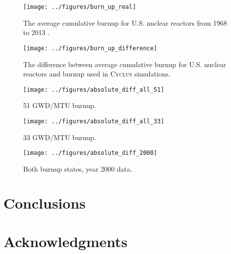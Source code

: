 \documentclass{anstrans}
\newcommand{\Cyclus}{\textsc{Cyclus}\xspace}%
\begin{document}
\begin{figure}[t] %
	\centering
	\texttt{[image: ../figures/burn\_up\_real]}
	\caption{The average cumulative burnup for U.S. nuclear reactors from 1968 to 2013 \cite{eia_spent_2015}.}
	\label{fig:burn_up_real}
\end{figure} 

\begin{figure}[t] %
	\centering
	\texttt{[image: ../figures/burn\_up\_difference]}
	\caption{The difference between average cumulative burnup for U.S. nuclear reactors and burnup used in \Cyclus simulations.}
	\label{fig:burn_up_difference}
\end{figure} 


\begin{figure*}[htb] %
	\centering
        \begin{subfigure}{0.9\textwidth}
        \texttt{[image: ../figures/absolute\_diff\_all\_51]}
        \caption{51 GWD/MTU burnup.}
	\label{fig:absolute_diff_all_51}
        \end{subfigure}
        \begin{subfigure}{0.9\textwidth}
        \texttt{[image: ../figures/absolute\_diff\_all\_33]}
        \caption{33 GWD/MTU burnup.}
	\label{fig:absolute_diff_all_33}
        \end{subfigure}
        \begin{subfigure}{0.9\textwidth}
        \texttt{[image: ../figures/absolute\_diff\_2000]}
        \caption{Both burnup states, year 2000 data.}
	\label{fig:absolute_diff_2000}
        \end{subfigure}
        \caption{The absolute difference between cumulative spent fuel mass calculated by 
        \gls{UDB} and \Cyclus for each isotope. Positive difference indicates \Cyclus 
        mass estimate is larger.}
        \label{fig:absolute}
\end{figure*} 
\FloatBarrier



\section{Conclusions}

\section{Acknowledgments}



\end{document}
